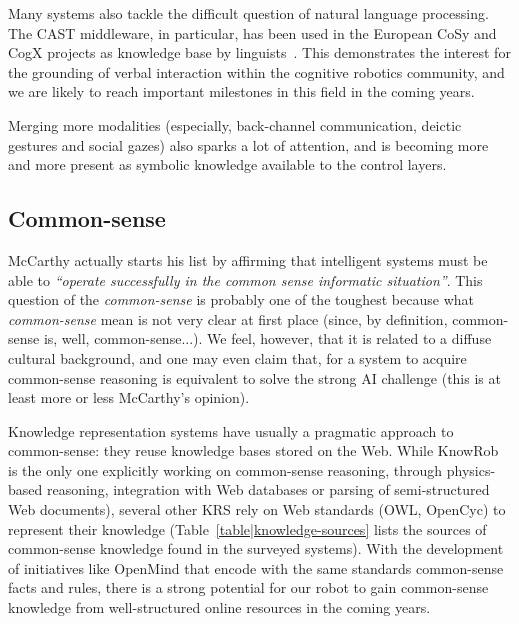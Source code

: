 \documentclass[journal]{IEEEtran}
\begin{document}
Many systems also tackle the difficult question of natural language processing.
The CAST middleware, in particular, has been used in the European CoSy and CogX
projects as knowledge base by linguists~\cite{Kruijff2010a}. This demonstrates
the interest for the grounding of verbal interaction within the cognitive
robotics community, and we are likely to reach important milestones in this
field in the coming years.

Merging more modalities (especially, back-channel communication, deictic
gestures and social gazes) also sparks a lot of attention, and is becoming more
and more present as symbolic knowledge available to the control layers.

\subsection{Common-sense}

McCarthy actually starts his list by affirming that intelligent systems must be
able to \emph{``operate successfully in the common sense informatic
situation''}. This question of the \emph{common-sense} is probably one of the
toughest because what \emph{common-sense} mean is not very clear at first place
(since, by definition, common-sense is, well, common-sense...). We feel,
however, that it is related to a diffuse cultural background, and one may even
claim that, for a system to acquire common-sense reasoning is equivalent to
solve the strong AI challenge (this is at least more or less McCarthy's opinion).

Knowledge representation systems have usually a pragmatic approach to
common-sense: they reuse knowledge bases stored on the Web. While {\sc KnowRob}
is the only one explicitly working on common-sense reasoning, through
physics-based reasoning, integration with Web databases or parsing of
semi-structured Web documents), several other KRS rely on Web standards (OWL,
OpenCyc) to represent their knowledge (Table~\ref{table|knowledge-sources} lists
the sources of common-sense knowledge found in the surveyed systems). With the
development of initiatives like OpenMind that encode with the same standards
common-sense facts and rules, there is a strong potential for our robot to gain
common-sense knowledge from well-structured online resources in the coming
years.
\end{document}
